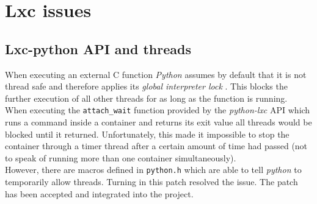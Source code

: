 \chapter{Lxc issues}

\section{Lxc-python API and threads}

When executing an external C function \textit{Python} assumes by default that it is not thread safe and
therefore applies its \textit{global interpreter lock} \cite{gil}. This blocks the further execution of all other
threads for as long as the function is running.\\
When executing the \texttt{attach\_wait} function provided by the \textit{python-lxc} API which runs a command
inside a container and returns its exit value
all threads would be blocked until it returned. Unfortunately,
this made it impossible to stop the container through a timer thread after a certain amount of time had
passed (not to speak of running more than one container simultaneously).\\
However, there are macros defined in \texttt{python.h} which are able to tell \textit{python} to temporarily allow threads.
Turning in this patch\cite{bugreport} resolved the issue. The patch has been accepted and integrated into the project.
